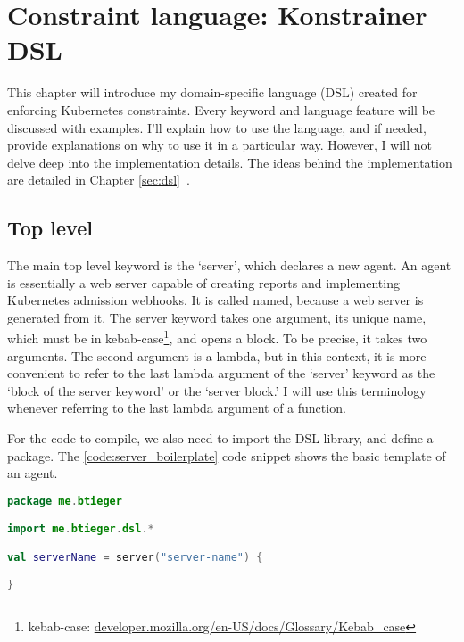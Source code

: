 \setlength{\parindent}{0pt}
\setlength{\parskip}{0.6em}

\chapter[Constraint language]{Constraint language: Konstrainer DSL}
\label{chap:konst_dsl}

This chapter will introduce my domain-specific language (DSL) created for enforcing Kubernetes constraints. Every keyword and language feature will be discussed with examples. I'll explain how to use the language, and if needed, provide explanations on why to use it in a particular way. However, I will not delve deep into the implementation details. The ideas behind the implementation are detailed in Chapter \ref{sec:dsl}~.

\section{Top level}

The main top level keyword is the `server', which declares a new agent. An agent is essentially a web server capable of creating reports and implementing Kubernetes admission webhooks. It is called named, because a web server is generated from it. The server keyword takes one argument, its unique name, which must be in kebab-case\footnote{kebab-case: \url{developer.mozilla.org/en-US/docs/Glossary/Kebab_case}}, and opens a block. To be precise, it takes two arguments. The second argument is a lambda, but in this context, it is more convenient to refer to the last lambda argument of the `server' keyword as the `block of the server keyword' or the `server block.' I will use this terminology whenever referring to the last lambda argument of a function.

For the code to compile, we also need to import the DSL library, and define a package. The \ref{code:server_boilerplate} code snippet shows the basic template of an agent.

\begin{lstlisting}[caption={Template of a DSL file},language=Kotlin,label=code:server_boilerplate]
package me.btieger

import me.btieger.dsl.*

val serverName = server("server-name") {

}
\end{lstlisting}

